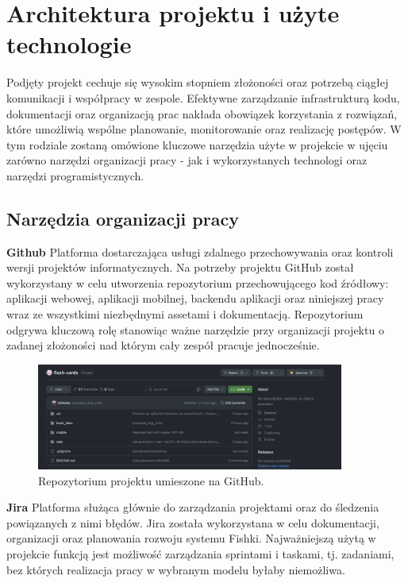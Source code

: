 \chapter{Architektura projektu i użyte technologie}
Podjęty projekt cechuje się wysokim stopniem złożoności oraz potrzebą ciągłej komunikacji i współpracy w zespole. Efektywne zarządzanie infrastrukturą kodu, dokumentacji oraz organizacją prac nakłada obowiązek korzystania z rozwiązań, które umożliwią wspólne planowanie, monitorowanie oraz realizację postępów. W tym rodziale zostaną omówione kluczowe narzędzia użyte w projekcie w ujęciu zarówno narzędzi organizacji pracy - jak i wykorzystanych technologi oraz narzędzi programistycznych.

\section{Narzędzia organizacji pracy}

\textbf{Github} Platforma dostarczająca usługi zdalnego przechowywania oraz kontroli wersji projektów informatycznych. Na potrzeby projektu GitHub został wykorzystany w celu utworzenia repozytorium przechowującego kod źródłowy: aplikacji webowej, aplikacji mobilnej, backendu aplikacji oraz niniejszej pracy wraz ze wszystkimi niezbędnymi assetami i dokumentacją. Repozytorium odgrywa kluczową rolę stanowiąc ważne narzędzie przy organizacji projektu o zadanej złożoności nad którym cały zespół pracuje jednocześnie.

\begin{figure}[H]
    \centering
    \includegraphics[width=0.9\textwidth]{chapters/chapter_7/github}
    \caption{Repozytorium projektu umieszone na GitHub.}
    \label{img:github}
\end{figure}


\textbf{Jira} Platforma służąca głównie do zarządzania projektami oraz do śledzenia powiązanych z nimi błędów. Jira została wykorzystana w celu dokumentacji, organizacji oraz planowania rozwoju systemu Fishki. Najważniejszą użytą w projekcie funkcją jest możliwość zarządzania sprintami i taskami, tj. zadaniami, bez których realizacja pracy w wybranym modelu byłaby niemożliwa.

